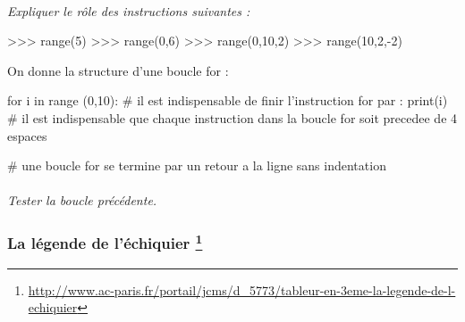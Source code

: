 \documentclass[11pt,oneside]{article}
\begin{document}
\setcounter{paragraph}{0}
\paragraph{}
\textit{Expliquer le rôle des instructions suivantes :}

\begin{py}
\begin{python}
>>> range(5) 
>>> range(0,6)
>>> range(0,10,2)
>>> range(10,2,-2)
\end{python}
\end{py}

On donne la structure d'une boucle \textsf{for} :
\begin{py}
\begin{python}
for i in range (0,10): # il est indispensable de finir l'instruction for par :
    print(i)           # il est indispensable que chaque instruction dans la boucle for soit precedee de 4 espaces

                       # une boucle for se termine par un retour a la ligne sans indentation
\end{python}
\end{py}

\paragraph{}
\textit{Tester la boucle précédente.}


\subsubsection*{La légende de l'échiquier \footnote{\url{http://www.ac-paris.fr/portail/jcms/d_5773/tableur-en-3eme-la-legende-de-l-echiquier}}}
\end{document}
